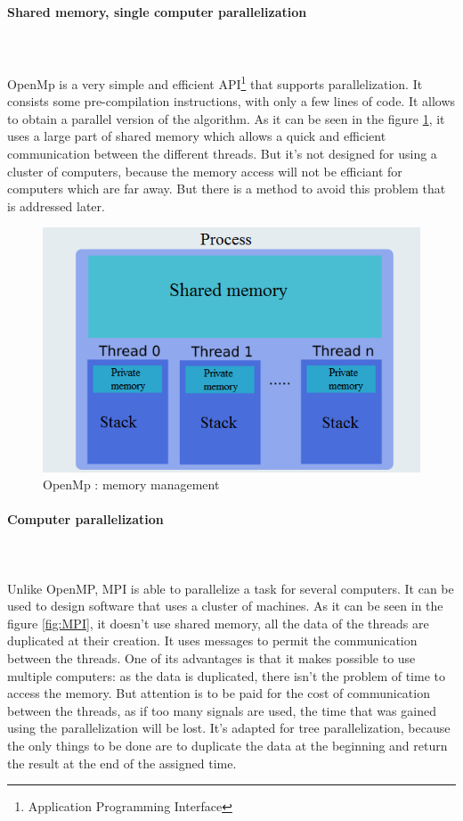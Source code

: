 \paragraph{Shared memory, single computer parallelization}\mbox{}\\\mbox{}\\
OpenMp is a very simple and efficient API\footnote{Application Programming Interface} that supports parallelization. It consists some pre-compilation instructions, with only a few lines of code. It allows to obtain a parallel version of the algorithm. As it can be seen in the figure \ref{fig:OpenMp}, it uses a large part of shared memory which allows a quick and efficient communication between the different threads. But it's not designed for using a cluster of computers, because the memory access will not be efficiant for computers which are far away. But there is a method to avoid this problem that is addressed later.
\begin{figure}[!h] 
\centerline{\includegraphics[scale=0.50]{3_Software_considered/MultithreadingMP_boost_Visual_MPI_5000_Zotero_Project_Baptiste/OpenMP}}
   \caption{\label{étiquette} OpenMp : memory management}
\label{fig:OpenMp}
\end{figure}
\newpage
\paragraph{Computer parallelization}\mbox{}\\\mbox{}\\
Unlike OpenMP, MPI is able to parallelize a task for several computers. It can be used to design software that uses a cluster of machines. As it can be seen in the figure \ref{fig:MPI}, it doesn't use shared memory, all the data of the threads are duplicated at their creation. It uses messages to permit the communication between the threads. One of its advantages is that it makes possible to use multiple computers: as the data is duplicated, there isn't the problem of time to access the memory. But attention is to be paid for the cost of communication between the threads, as if too many signals are used, the time that was gained using the parallelization will be lost. It's adapted for tree parallelization, because the only things to be done are to duplicate the data at the beginning and return the result at the end of the assigned time.


